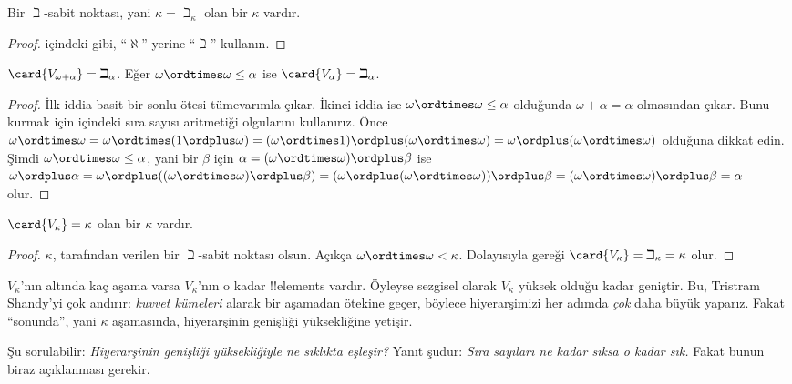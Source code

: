 \documentclass[../../../include/open-logic-section]{subfiles}
\begin{document}
\begin{prop}
Bir $\beth$-sabit noktası, yani $\kappa=\beth_\kappa$ olan bir $\kappa$
vardır.
\end{prop}

\begin{proof}
 içindeki gibi, ``$\aleph$'' yerine ``$\beth$''
kullanın.
\end{proof}

\begin{prop}
$\card{V_{\omega+\alpha}}=\beth_\alpha$. Eğer
$\omega\ordtimes\omega\leq\alpha$ ise
$\card{V_\alpha}=\beth_\alpha$.
\end{prop}

\begin{proof}
İlk iddia basit bir sonlu ötesi tümevarımla çıkar. İkinci iddia ise
$\omega\ordtimes\omega\leq\alpha$ olduğunda
$\omega+\alpha=\alpha$ olmasından çıkar. Bunu kurmak için
 içindeki sıra sayısı aritmetiği olgularını
kullanırız. Önce
$\omega\ordtimes\omega=\omega\ordtimes(1\ordplus\omega)=
(\omega\ordtimes1)\ordplus(\omega\ordtimes\omega)=
\omega\ordplus(\omega\ordtimes\omega)$ olduğuna dikkat edin. Şimdi
$\omega\ordtimes\omega\leq\alpha$, yani bir $\beta$ için
$\alpha=(\omega\ordtimes\omega)\ordplus\beta$ ise
$\omega\ordplus\alpha=\omega\ordplus
((\omega\ordtimes\omega)\ordplus\beta)=
(\omega\ordplus(\omega\ordtimes\omega))\ordplus\beta=
(\omega\ordtimes\omega)\ordplus\beta=\alpha$ olur.
\end{proof}

\begin{cor}
$\card{V_\kappa}=\kappa$ olan bir $\kappa$ vardır.
\end{cor}

\begin{proof}
$\kappa$,  tarafından verilen bir $\beth$-sabit noktası
olsun. Açıkça $\omega\ordtimes\omega<\kappa$. Dolayısıyla
 gereği
$\card{V_\kappa}=\beth_\kappa=\kappa$ olur.
\end{proof}

$V_\kappa$'nın altında kaç aşama varsa $V_\kappa$'nın o kadar
!!{element}s vardır. Öyleyse sezgisel olarak $V_\kappa$ yüksek olduğu kadar
geniştir. Bu, Tristram Shandy'yi çok andırır: \emph{kuvvet kümeleri} alarak bir
aşamadan ötekine geçer, böylece hiyerarşimizi her adımda \emph{çok} daha
büyük yaparız. Fakat ``sonunda'', yani $\kappa$ aşamasında, hiyerarşinin
genişliği yüksekliğine yetişir.

Şu sorulabilir: \emph{Hiyerarşinin genişliği yüksekliğiyle ne sıklıkta
eşleşir?} Yanıt şudur: \emph{Sıra sayıları ne kadar sıksa o kadar sık.}
Fakat bunun biraz açıklanması gerekir.
\end{document}
